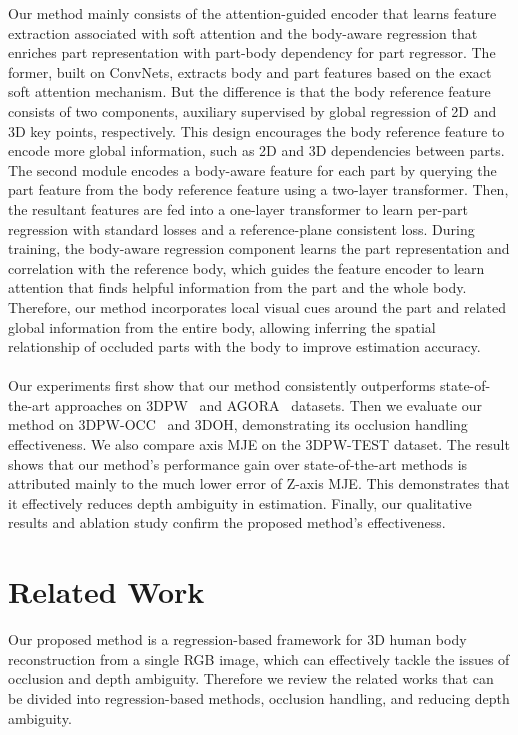 \documentclass[10pt,twocolumn,letterpaper]{article}
\begin{document}
Our method mainly consists of the attention-guided encoder that learns feature extraction associated with soft attention and the body-aware regression that enriches part representation with part-body dependency for part regressor. 
The former, built on ConvNets, extracts body and part features based on the exact soft attention mechanism. But the difference is that the body reference feature consists of two components, auxiliary supervised by global regression of 2D and 3D key points, respectively. This design encourages the body reference feature to encode more global information, such as 2D and 3D dependencies between parts.
The second module encodes a body-aware feature for each part by querying the part feature from the body reference feature using a two-layer transformer. Then, the resultant features are fed into a one-layer transformer to learn per-part regression with standard losses and a reference-plane consistent loss. During training, the body-aware regression component learns the part representation and correlation with the reference body, which guides the feature encoder to learn attention that finds helpful information from the part and the whole body. Therefore, our method incorporates local visual cues around the part and related global information from the entire body, allowing inferring the spatial relationship of occluded parts with the body to improve estimation accuracy.\\
\\
Our experiments first show that our method consistently outperforms state-of-the-art approaches on 3DPW~\cite{von2018recovering} and AGORA~\cite{patel2021agora} datasets. Then we evaluate our method on 3DPW-OCC~\cite{zhang2020object} and 3DOH\cite{zhang2020object}, demonstrating its occlusion handling effectiveness. We also compare axis MJE on the 3DPW-TEST dataset. The result shows that our method's performance gain over state-of-the-art methods is attributed mainly to the much lower error of Z-axis MJE. This demonstrates that it effectively reduces depth ambiguity in estimation. Finally, our qualitative results and ablation study confirm the proposed method's effectiveness.














\section{Related Work}
Our proposed method is a regression-based framework for 3D human body reconstruction from a single RGB image, which can effectively tackle the issues of occlusion and depth ambiguity. Therefore we review the related works that can be divided into regression-based methods, occlusion handling, and reducing depth ambiguity.
\end{document}
